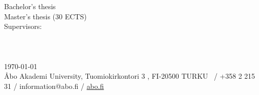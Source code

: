 \documentclass[
12pt, %
oneside, %
english, %
onehalfspacing, %
nolistspacing, %
chapterinoneline, %
]{MastersDoctoralThesis} %
\begin{document}
\begin{titlepage}
\begin{bottompar}
        \begin{flushright}
            \ifdefined\swedishthesis
                Bachelor's thesis  \\
            \else
                Master's thesis (30 ECTS)  \\
                Supervisors: \supname \\
            \fi
            \deptname \\
            \facname \\
            \univname \\
            \today\\%
            \vspace{5 mm}
            {\fontsize{8pt}{1em}\selectfont Åbo Akademi University, Tuomiokirkontori 3 , FI-20500 TURKU  ~/ +358 2 215 31 / information@abo.fi  / \href{http://abo.fi}{abo.fi}
            }
        \end{flushright}
    \end{bottompar}

\end{titlepage}
\restoregeometry



\end{document}
